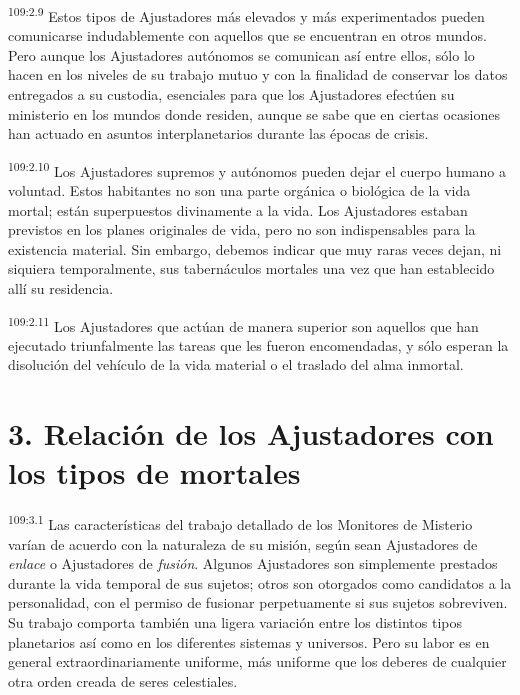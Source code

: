 \par
\textsuperscript{109:2.9} Estos tipos de Ajustadores más elevados y más experimentados pueden comunicarse indudablemente con aquellos que se encuentran en otros mundos. Pero aunque los Ajustadores autónomos se comunican así entre ellos, sólo lo hacen en los niveles de su trabajo mutuo y con la finalidad de conservar los datos entregados a su custodia, esenciales para que los Ajustadores efectúen su ministerio en los mundos donde residen, aunque se sabe que en ciertas ocasiones han actuado en asuntos interplanetarios durante las épocas de crisis.

\par
\textsuperscript{109:2.10} Los Ajustadores supremos y autónomos pueden dejar el cuerpo humano a voluntad. Estos habitantes no son una parte orgánica o biológica de la vida mortal; están superpuestos divinamente a la vida. Los Ajustadores estaban previstos en los planes originales de vida, pero no son indispensables para la existencia material. Sin embargo, debemos indicar que muy raras veces dejan, ni siquiera temporalmente, sus tabernáculos mortales una vez que han establecido allí su residencia.

\par
\textsuperscript{109:2.11} Los Ajustadores que actúan de manera superior son aquellos que han ejecutado triunfalmente las tareas que les fueron encomendadas, y sólo esperan la disolución del vehículo de la vida material o el traslado del alma inmortal.

\section*{3. Relación de los Ajustadores con los tipos de mortales}
\par
\textsuperscript{109:3.1} Las características del trabajo detallado de los Monitores de Misterio varían de acuerdo con la naturaleza de su misión, según sean Ajustadores de \textit{enlace} o Ajustadores de \textit{fusión}. Algunos Ajustadores son simplemente prestados durante la vida temporal de sus sujetos; otros son otorgados como candidatos a la personalidad, con el permiso de fusionar perpetuamente si sus sujetos sobreviven. Su trabajo comporta también una ligera variación entre los distintos tipos planetarios así como en los diferentes sistemas y universos. Pero su labor es en general extraordinariamente uniforme, más uniforme que los deberes de cualquier otra orden creada de seres celestiales.

